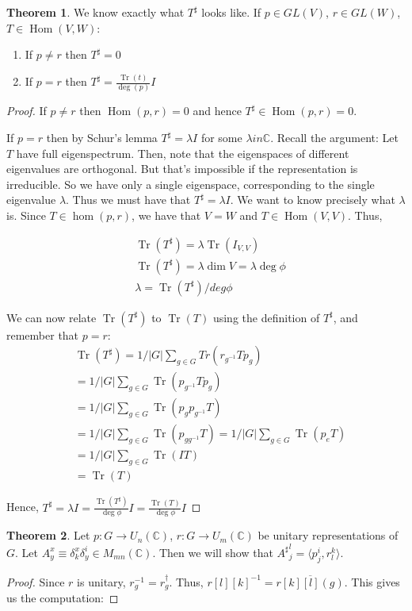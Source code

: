 \documentclass{book}
\newcommand{\Hom}{\operatorname{Hom}}
\newcommand{\Tr}{\operatorname{Tr}}
\newcommand{\C}{\ensuremath{\mathbb{C}}}
\theoremstyle{definition}
\newtheorem{theorem}{Theorem}
\begin{document}
\begin{theorem}
We know exactly what $T^\sharp$ looks like.
If $p \in GL(V)$, $r \in GL(W)$, $T \in \Hom(V, W)$:
\begin{enumerate}
\item If $p \neq r$ then $T^\sharp = 0$
\item If $p = r$ then $T^\sharp = \frac{\Tr(t)}{\deg(p)} I$
\end{enumerate}
\end{theorem}
\begin{proof}
If $p \neq r$ then $\Hom(p, r) = 0$ and hence $T^\sharp \in \Hom(p, r) = 0$.

If $p = r$ then by Schur's lemma $T^\sharp = \lambda I$ for some $\lambda in \C$. Recall
the argument: Let $T$ have full eigenspectrum. Then, note that the eigenspaces
of different eigenvalues are orthogonal. But that's impossible if the
representation is irreducible. So we have only a single eigenspace, corresponding
to the single eigenvalue $\lambda$.  Thus we must have that $T^\sharp = \lambda I$.
We want to know precisely what $\lambda$ is. Since $T \in \hom(p, r)$, we have
that $V = W$ and $T \in \Hom(V, V)$. Thus, 

\begin{align*}
&\Tr(T^\sharp) = \lambda \Tr(I_{V, V}) \\
& \Tr(T^\sharp) = \lambda \dim V = \lambda \deg \phi \\
& \lambda = \Tr(T^\sharp)/deg \phi
\end{align*}

We can now relate $\Tr(T^\sharp)$  to $\Tr(T)$ using the definition of $T^\sharp$,
and remember that $p = r$:
\begin{align*}
&\Tr(T^\sharp) = 1/|G| \sum_{g \in G} Tr(r_{g^{-1}} T p_g) \\
&= 1/|G| \sum_{g \in G}\Tr(p_{g^{-1}} T p_g) \\
&= 1/|G| \sum_{g \in G} \Tr(p_g p_{g^{-1}} T) \\
& = 1/|G| \sum_{g \in G} \Tr(p_{g g^{-1}} T) = 1/|G| \sum_{g \in G}\Tr(p_e T) \\
&= 1/|G| \sum_{g \in G} \Tr(I T) \\
&= \Tr(T)
\end{align*}

Hence, $T^\sharp = \lambda I = \frac{\Tr(T^\sharp)}{\deg \phi}I = \frac{\Tr(T)}{\deg \phi}I$
\end{proof}

\begin{theorem}
Let $p: G \rightarrow U_n(\C)$, $r: G \rightarrow U_m(\C)$ be unitary representations
of $G$. Let $A^x_y \equiv \delta^x_k \delta^i_y \in M_{mn}(\C)$. Then we will
show that ${A^\sharp}^l_j = \langle p^i_j, r^k_l \rangle$.
\end{theorem}
\begin{proof}
Since $r$ is unitary, $r_g^{-1} = r_g^\dagger$. Thus, $r[l][k]^{-1} = \overline{r[k][l](g)}$.
This gives us the computation:

\end{proof}
\end{document}
